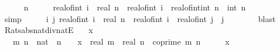 \begin{isabellebody}
\ \ \isamarkupfalse%
\ {\isachardoublequoteopen}{}\ {\isacharless}{\kern0pt}\ n{\isachardoublequoteclose}\isanewline
\ \ \isamarkupfalse%
\ \isamarkupfalse%
\ {\isachardoublequoteopen}real{\isacharunderscore}{\kern0pt}of{\isacharunderscore}{\kern0pt}int\ i\ {\isacharslash}{\kern0pt}\ real\ n\ {\isacharequal}{\kern0pt}\ real{\isacharunderscore}{\kern0pt}of{\isacharunderscore}{\kern0pt}int\ i\ {\isacharslash}{\kern0pt}\ real{\isacharunderscore}{\kern0pt}of{\isacharunderscore}{\kern0pt}int{\isacharparenleft}{\kern0pt}int\ n{\isacharparenright}{\kern0pt}\ {\isasymand}\ int\ n\ {\isasymnoteq}\ {}{\isachardoublequoteclose}\isanewline
\ \ \ \ \isamarkupfalse%
\ simp\isanewline
\ \ \isamarkupfalse%
\ \isamarkupfalse%
\ {\isachardoublequoteopen}{\isasymexists}i{\isacharprime}{\kern0pt}\ j{\isachardot}{\kern0pt}\ real{\isacharunderscore}{\kern0pt}of{\isacharunderscore}{\kern0pt}int\ i\ {\isacharslash}{\kern0pt}\ real\ n\ {\isacharequal}{\kern0pt}\ real{\isacharunderscore}{\kern0pt}of{\isacharunderscore}{\kern0pt}int\ i{\isacharprime}{\kern0pt}\ {\isacharslash}{\kern0pt}\ real{\isacharunderscore}{\kern0pt}of{\isacharunderscore}{\kern0pt}int\ j\ {\isasymand}\ j\ {\isasymnoteq}\ {}{\isachardoublequoteclose}\isanewline
\ \ \ \ \isamarkupfalse%
\ blast\isanewline
{}\isamarkupfalse%
%
\endisatagproof
{\isafoldproof}%
%
\isadelimproof
\isanewline
%
\endisadelimproof
\isanewline
{}\isamarkupfalse%
\ Rats{\isacharunderscore}{\kern0pt}abs{\isacharunderscore}{\kern0pt}nat{\isacharunderscore}{\kern0pt}div{\isacharunderscore}{\kern0pt}natE{\isacharcolon}{\kern0pt}\isanewline
\ \ \ {\isachardoublequoteopen}x\ {\isasymin}\ {\isasymrat}{\isachardoublequoteclose}\isanewline
\ \ \ m\ n\ {\isacharcolon}{\kern0pt}{\isacharcolon}{\kern0pt}\ nat\ \ {\isachardoublequoteopen}n\ {\isasymnoteq}\ {}{\isachardoublequoteclose}\ \ {\isachardoublequoteopen}{\isasymbar}x{\isasymbar}\ {\isacharequal}{\kern0pt}\ real\ m\ {\isacharslash}{\kern0pt}\ real\ n{\isachardoublequoteclose}\ \ {\isachardoublequoteopen}coprime\ m\ n{\isachardoublequoteclose}\isanewline
%
\isadelimproof
%
\endisadelimproof
%
\isatagproof
{}\isamarkupfalse%
\ {\isacharminus}{\kern0pt}\isanewline
\ \ \isamarkupfalse%
\ {\isacartoucheopen}x\ {\isasymin}\ {\isasymrat}{\isacartoucheclose}\ \isamarkupfalse%

\end{isabellebody}
